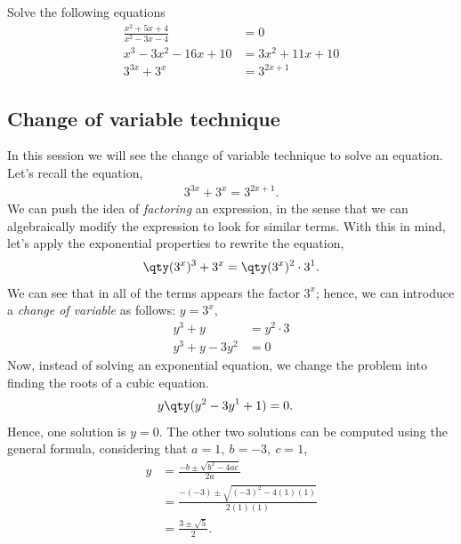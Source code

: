 \documentclass[../main-notes.tex]{subfile}
\begin{document}
Solve the following equations
\begin{align*}
    \frac{x^2+5x+4}{x^2-3x-4} &= 0 \\
    x^3-3x^2-16x+10 &= 3x^2+11x+10 \\
    3^{3x} + 3^{x} &= 3^{2x+1}
\end{align*}


\newpage 

\subsection{Change of variable technique}

In this session we will see the change of variable technique to solve an equation.
Let's recall the equation,
\begin{gather*}
    3^{3x} + 3^{x} = 3^{2x+1}.
\end{gather*}
We can push the idea of \emph{factoring} an expression, in the sense that we can algebraically modify the expression to look for similar terms.
With this in mind, let's apply the exponential properties to rewrite the equation,
\begin{gather*}
    \qty(3^{x})^3 + 3^{x} = \qty(3^{x})^2\cdot 3^1.
\end{gather*}
We can see that in all of the terms appears the factor $3^x$; hence, we can introduce a \emph{change of variable} as follows: $y=3^x$,
\begin{align*}
    y^3 + y &= y^2\cdot 3 \\
    y^3 + y - 3y^2 &= 0
\end{align*}
Now, instead of solving an exponential equation, we change the problem into finding the roots of a cubic equation.
\begin{align*}
     y\qty(y^2 - 3y^1 + 1) &= 0.
\end{align*}
Hence, one solution is $y=0$.
The other two solutions can be computed using the general formula, considering that $a=1,~b=-3,~c=1$,
\begin{align*}
    y &= \frac{-b\pm\sqrt{b^2-4ac}}{2a} \\
      &= \frac{-(-3)\pm\sqrt{(-3)^2 -4(1)(1)}}{2(1)(1)} \\
      &= \frac{3\pm\sqrt{5}}{2}.
\end{align*}
\end{document}
